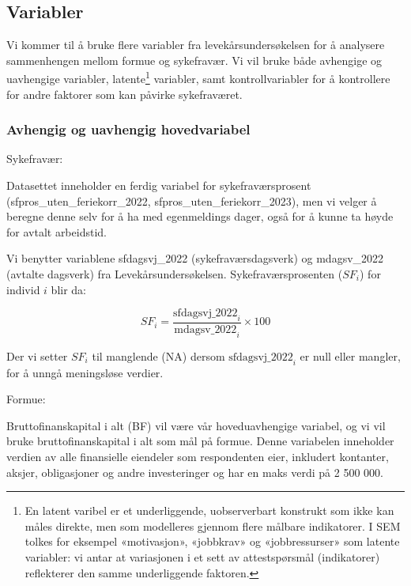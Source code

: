 \documentclass[
  12pt,
  a4paper,
  DIV=11,
  numbers=noendperiod]{scrartcl}
\begin{document}
\subsection{Variabler}\label{variabler}

Vi kommer til å bruke flere variabler fra levekårsundersøkelsen for å
analysere sammenhengen mellom formue og sykefravær. Vi vil bruke både
avhengige og uavhengige variabler, latente\footnote{En latent varibel er
  et underliggende, uobserverbart konstrukt som ikke kan måles direkte,
  men som modelleres gjennom flere målbare indikatorer. I SEM tolkes for
  eksempel «motivasjon», «jobbkrav» og «jobbressurser» som latente
  variabler: vi antar at variasjonen i et sett av attestspørsmål
  (indikatorer) reflekterer den samme underliggende faktoren.}
variabler, samt kontrollvariabler for å kontrollere for andre faktorer
som kan påvirke sykefraværet.

\subsubsection{Avhengig og uavhengig
hovedvariabel}\label{avhengig-og-uavhengig-hovedvariabel}

Sykefravær:

Datasettet inneholder en ferdig variabel for sykefraværsprosent
(sfpros\_uten\_feriekorr\_2022, sfpros\_uten\_feriekorr\_2023), men vi
velger å beregne denne selv for å ha med egenmeldings dager, også for å
kunne ta høyde for avtalt arbeidstid.

Vi benytter variablene sfdagsvj\_2022 (sykefraværsdagsverk) og
mdagsv\_2022 (avtalte dagsverk) fra Levekårsundersøkelsen.
Sykefraværsprosenten (\(SF_i\)) for individ \(i\) blir da:

\[
SF_i = \frac{ \mathrm{sfdagsvj\_2022}_i }{ \mathrm{mdagsv\_2022}_i } \times 100
\]

Der vi setter \(SF_i\) til manglende (NA) dersom
\(\mathrm{sfdagsvj\_2022}_i\) er null eller mangler, for å unngå
meningsløse verdier.

Formue:

Bruttofinanskapital i alt (BF) vil være vår hoveduavhengige variabel, og
vi vil bruke bruttofinanskapital i alt som mål på formue. Denne
variabelen inneholder verdien av alle finansielle eiendeler som
respondenten eier, inkludert kontanter, aksjer, obligasjoner og andre
investeringer og har en maks verdi på 2 500 000.
\end{document}

